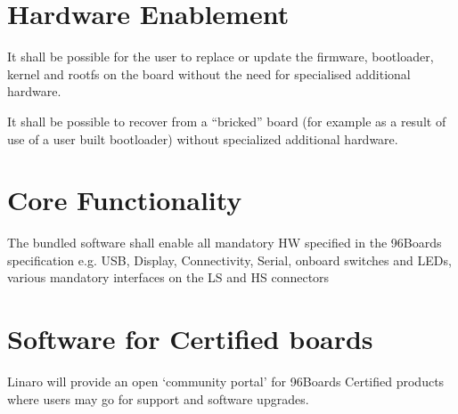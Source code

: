 \documentclass[a4paper,10pt,oneside,english]{sphinxmanual}
\begin{document}
\section{Hardware Enablement}
\label{\detokenize{chapter1-ce:hardware-enablement}}
\sphinxAtStartPar
It shall be possible for the user to replace or update the firmware, bootloader, kernel and rootfs on the board without the need for specialised additional hardware.

\sphinxAtStartPar
It shall be possible to recover from a “bricked” board (for example as a result of use of a user built bootloader) without specialized additional hardware.


\section{Core Functionality}
\label{\detokenize{chapter1-ce:core-functionality}}
\sphinxAtStartPar
The bundled software shall enable all mandatory HW specified in the 96Boards specification e.g. USB, Display, Connectivity, Serial, on\sphinxhyphen{}board switches and LEDs, various mandatory interfaces on the LS and HS connectors


\section{Software for Certified boards}
\label{\detokenize{chapter1-ce:software-for-certified-boards}}
\sphinxAtStartPar
Linaro will provide an open ‘community portal’ for 96Boards Certified products where users may go for support and software upgrades.
\end{document}
